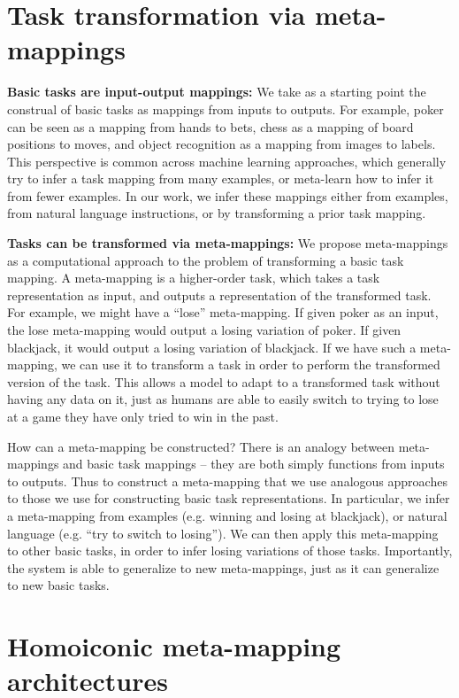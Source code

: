 \section{Task transformation via meta-mappings} \label{sec:HoMM:metamappings}

\textbf{Basic tasks are input-output mappings:} We take as a starting point the construal of basic tasks as mappings from inputs to outputs. For example, poker can be seen as a mapping from hands to bets, chess as a mapping of board positions to moves, and object recognition as a mapping from images to labels. This perspective is common across machine learning approaches, which generally try to infer a task mapping from many examples, or meta-learn how to infer it from fewer examples. In our work, we infer these mappings either from examples, from natural language instructions, or by transforming a prior task mapping. 

\textbf{Tasks can be transformed via meta-mappings:} We propose meta-mappings as a computational approach to the problem of transforming a basic task mapping. A meta-mapping is a higher-order task, which takes a task representation as input, and outputs a representation of the transformed task. For example, we might have a ``lose'' meta-mapping. If given poker as an input, the lose meta-mapping would output a losing variation of poker. If given blackjack, it would output a losing variation of blackjack. If we have such a meta-mapping, we can use it to transform a task in order to perform the transformed version of the task. This allows a model to adapt to a transformed task without having any data on it, just as humans are able to easily switch to trying to lose at a game they have only tried to win in the past. 

How can a meta-mapping be constructed? There is an analogy between meta-mappings and basic task mappings -- they are both simply functions from inputs to outputs. Thus to construct a meta-mapping that we use analogous approaches to those we use for constructing basic task representations. In particular, we infer a meta-mapping from examples (e.g. winning and losing at blackjack), or natural language (e.g. ``try to switch to losing''). We can then apply this meta-mapping to other basic tasks, in order to infer losing variations of those tasks. Importantly, the system is able to generalize to new meta-mappings, just as it can generalize to new basic tasks. 



\section{Homoiconic meta-mapping architectures} \label{sec:HoMM:architecture}

